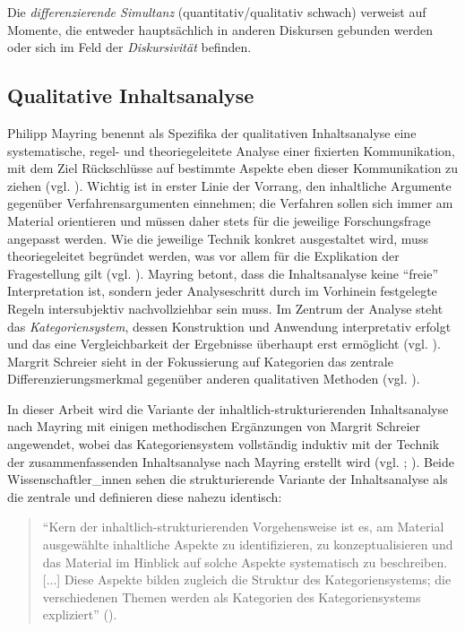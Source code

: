 \documentclass[12pt, titlepage=true, toc=bib]{scrartcl}
\begin{document}
\noindent Die \textit{differenzierende Simultanz} (quantitativ/qualitativ schwach) verweist auf Momente, die entweder hauptsächlich in anderen Diskursen gebunden werden oder sich im Feld der \textit{Diskursivität} befinden.

\subsection{Qualitative Inhaltsanalyse}

Philipp Mayring benennt als Spezifika der qualitativen Inhaltsanalyse eine systematische, regel- und theoriegeleitete Analyse einer fixierten Kommunikation, mit dem Ziel Rückschlüsse auf bestimmte Aspekte eben dieser Kommunikation zu ziehen (vgl. \cite*[13]{mayring_qualitative_2010}). Wichtig ist in erster Linie der Vorrang, den inhaltliche Argumente gegenüber Verfahrensargumenten einnehmen; die Verfahren sollen sich immer am Material orientieren und müssen daher stets für die jeweilige Forschungsfrage angepasst werden. Wie die jeweilige Technik konkret ausgestaltet wird, muss theoriegeleitet begründet werden, was vor allem für die Explikation der Fragestellung gilt (vgl. \cite[50-51]{mayring_qualitative_2010}). Mayring betont, dass die Inhaltsanalyse keine "`freie"' Interpretation ist, sondern jeder Analyseschritt durch im Vorhinein festgelegte Regeln intersubjektiv nachvollziehbar sein muss. Im Zentrum der Analyse steht das \textit{Kategoriensystem}, dessen Konstruktion und Anwendung interpretativ erfolgt und das eine Vergleichbarkeit der Ergebnisse überhaupt erst ermöglicht (vgl. \cite[49]{mayring_qualitative_2010}). Margrit Schreier sieht in der Fokussierung auf Kategorien das zentrale Differenzierungsmerkmal gegenüber anderen qualitativen Methoden (vgl. \cite[3]{schreier_varianten_2014}).

In dieser Arbeit wird die Variante der inhaltlich-strukturierenden Inhaltsanalyse nach Mayring mit einigen methodischen Ergänzungen von Margrit Schreier angewendet, wobei das Kategoriensystem vollständig induktiv mit der Technik der zusammenfassenden Inhaltsanalyse nach Mayring erstellt wird (vgl. \cite{mayring_qualitative_2010}; \cite{schreier_varianten_2014}). Beide Wissenschaftler\_innen sehen die strukturierende Variante der Inhaltsanalyse als die zentrale und definieren diese nahezu identisch:

\begin{singlespace*}
\begin{quote}
"`Kern der inhaltlich-strukturierenden Vorgehensweise ist es, am Material ausgewählte inhaltliche Aspekte zu identifizieren, zu konzeptualisieren und das Material im Hinblick auf solche Aspekte systematisch zu beschreiben. [...] Diese Aspekte bilden zugleich die Struktur des Kategoriensystems; die verschiedenen Themen werden als Kategorien des Kategoriensystems expliziert"' (\cite[5]{schreier_varianten_2014}).
\end{quote}
\end{singlespace*}
\end{document}
